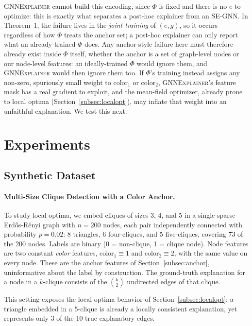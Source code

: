 \documentclass{article}
\newcommand{\GNNEx}{\textsc{GNNExplainer}\xspace}
\theoremstyle{definition}
\begin{document}
\GNNEx cannot build this encoding, since $\Phi$ is fixed and there is no $e$
to optimize: this is exactly what separates a post-hoc explainer from an
SE-GNN. In Theorem~1, the failure lives in the \emph{joint training} of
$(e,g)$, so it occurs regardless of how $\Phi$ treats the anchor set; a
post-hoc explainer can only report what an already-trained $\Phi$ does. Any
anchor-style failure here must therefore already exist inside $\Phi$
itself, whether the anchor is a set of graph-level nodes
\citep{azzolin2026gnnexplanations} or our node-level features: an
ideally-trained $\Phi$ would ignore them, and \GNNEx would then ignore them
too. If $\Phi$'s training instead assigns any non-zero, spuriously small
weight to $\text{color}_1$ or $\text{color}_2$, \GNNEx's feature mask has a
real gradient to exploit, and the mean-field optimizer, already prone to
local optima (Section~\ref{subsec:localopt}), may inflate that weight into
an unfaithful explanation. We test this next.


\section{Experiments}
\label{sec:experiments}

\subsection{Synthetic Dataset}

\paragraph{Multi-Size Clique Detection with a Color Anchor.}
To study local optima, we embed cliques of sizes 3, 4, and 5 in a single sparse
Erd\H{o}s-R\'{e}nyi graph \citep{erdos1959random} with $n=200$ nodes, each
pair independently connected with probability $p=0.02$: 8 triangles,
6 four-cliques, and 5 five-cliques, covering 73 of the 200 nodes. Labels are
binary (0 = non-clique, 1 = clique node). Node features are two constant
\emph{color} features, $\text{color}_1 \equiv 1$ and $\text{color}_2 \equiv
2$, with the same value on every node. These are the anchor features of
Section~\ref{subsec:anchor}, uninformative about the label by construction.
The ground-truth explanation for a node in a $k$-clique consists of the
$\binom{k}{2}$ undirected edges of that clique.

This setting exposes the local-optima behavior of Section~\ref{subsec:localopt}:
a triangle embedded in a 5-clique is already a locally consistent
explanation, yet represents only 3 of the 10 true explanatory edges.
\end{document}
